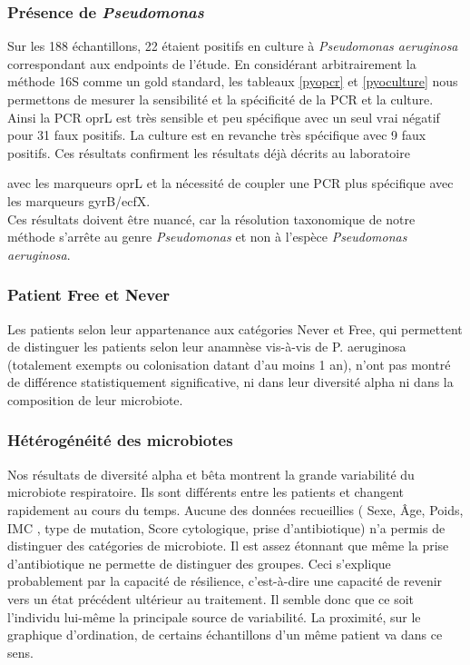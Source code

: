 \documentclass[12pt,a4paper]{article}
\begin{document}
\subsubsection{Présence de \textit{Pseudomonas}}
Sur les 188 échantillons, 22 étaient positifs en culture à \textit{Pseudomonas aeruginosa} correspondant aux endpoints de l'étude. En considérant arbitrairement la méthode 16S comme un gold standard, les tableaux \ref{pyopcr} et \ref{pyoculture} nous permettons de mesurer la sensibilité et la spécificité de la PCR et la culture. 
Ainsi la PCR oprL est très sensible et peu spécifique  avec un seul vrai négatif pour 31 faux positifs. 
La culture est en revanche très spécifique avec 9 faux positifs. 
Ces résultats confirment les résultats déjà décrits au laboratoire{\cite{LeGall} avec les marqueurs oprL et la nécessité de coupler une PCR plus spécifique avec les marqueurs gyrB/ecfX. \\
Ces résultats doivent être nuancé, car la résolution taxonomique de notre méthode s'arrête au genre \textit{Pseudomonas} et non à l'espèce \textit{Pseudomonas aeruginosa}.

\subsubsection{Patient Free et Never}
Les patients selon leur appartenance aux catégories Never et Free\cite{Lee2003}, qui permettent de distinguer les patients selon leur anamnèse vis-à-vis de P. aeruginosa (totalement exempts ou colonisation datant d'au moins 1 an), n'ont pas montré de différence statistiquement significative, ni dans leur diversité alpha ni dans la composition de leur microbiote. 
 
\subsubsection{Hétérogénéité des microbiotes}
Nos résultats de diversité alpha et bêta montrent la grande variabilité du microbiote respiratoire. Ils sont différents entre les patients et changent rapidement au cours du temps. Aucune des données recueillies ( Sexe, Âge, Poids, IMC , type de mutation, Score cytologique, prise d'antibiotique) n'a permis de distinguer des catégories de microbiote. Il est assez étonnant que même la prise d'antibiotique ne permette de distinguer des groupes. Ceci s'explique probablement par la capacité de résilience, c'est-à-dire une capacité de revenir vers un état précédent ultérieur au traitement. Il semble donc que ce soit l'individu lui-même la principale source de variabilité. La proximité, sur le graphique d'ordination, de certains échantillons d'un même patient va dans ce sens. 

}
\end{document}
